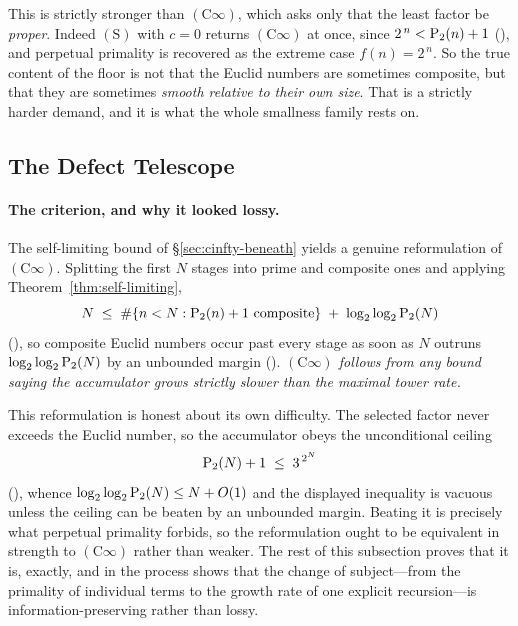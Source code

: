 \noindent
This is strictly stronger than $(\mathrm{C}\infty)$, which asks only that
the least factor be \emph{proper}.  Indeed $(\mathrm{S})$ with $c = 0$
returns $(\mathrm{C}\infty)$ at once, since $2^{\,n} < \mathrm{P}_{2}(n)+1$
(),
and perpetual primality is recovered as the extreme case
$f(n) = 2^{\,n}$.  So the true content of the floor is not that the
Euclid numbers are sometimes composite, but that they are sometimes
\emph{smooth relative to their own size}.  That is a strictly harder
demand, and it is what the whole smallness family rests on.

\subsection{The Defect Telescope}
\label{sec:defect-telescope}

\paragraph{The criterion, and why it looked lossy.}
The self-limiting bound of \S\ref{sec:cinfty-beneath} yields a genuine
reformulation of $(\mathrm{C}\infty)$.  Splitting the first $N$ stages into
prime and composite ones and applying Theorem~\ref{thm:self-limiting},
\[
  N \;\leq\; \#\{n < N : \mathrm{P}_{2}(n)+1 \text{ composite}\}
      \;+\; \log_2\log_2 \mathrm{P}_{2}(N)
\]
(),
so composite Euclid numbers occur past every stage as soon as $N$ outruns
$\log_2\log_2 \mathrm{P}_{2}(N)$ by an unbounded margin
().
\emph{$(\mathrm{C}\infty)$ follows from any bound saying the accumulator
grows strictly slower than the maximal tower rate.}

This reformulation is honest about its own difficulty.  The selected
factor never exceeds the Euclid number, so the accumulator obeys the
unconditional ceiling
\[
  \mathrm{P}_{2}(N) + 1 \;\leq\; 3^{\,2^{N}}
\]
(),
whence $\log_2\log_2 \mathrm{P}_{2}(N) \leq N + O(1)$ and the displayed
inequality is vacuous unless the ceiling can be beaten by an unbounded
margin.  Beating it is precisely what perpetual primality forbids, so the
reformulation ought to be equivalent in strength to $(\mathrm{C}\infty)$
rather than weaker.  The rest of this subsection proves that it is,
exactly, and in the process shows that the change of subject---from the
primality of individual terms to the growth rate of one explicit
recursion---is information-preserving rather than lossy.

